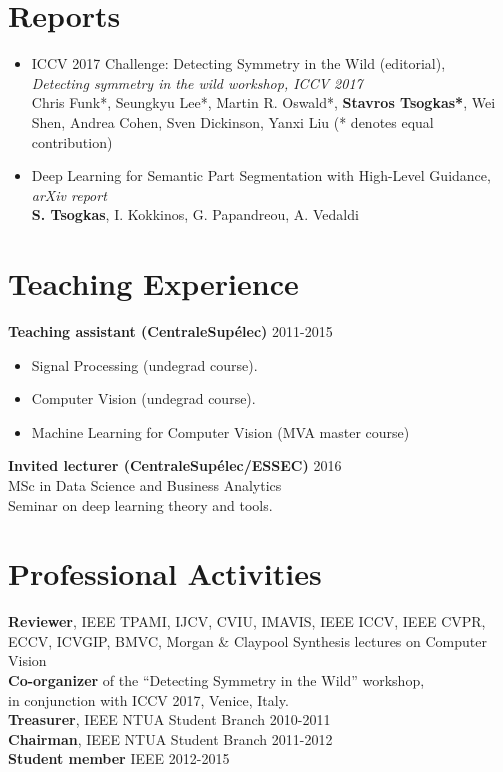 \documentclass[margin]{res}
\begin{document}
\begin{resume}
\section{Reports}
	\begin{itemize}
		\item ICCV 2017 Challenge: Detecting Symmetry in the Wild (editorial), \\
		\emph{Detecting symmetry in the wild workshop, ICCV 2017}\\
		Chris Funk*, Seungkyu Lee*, Martin R. Oswald*, \textbf{Stavros Tsogkas*}, 
		Wei Shen, Andrea Cohen, Sven Dickinson, Yanxi Liu 
		(* denotes equal contribution)
		\item  Deep Learning for Semantic Part Segmentation with High-Level Guidance, \emph{arXiv report}\\
		\textbf{S. Tsogkas}, I. Kokkinos, G. Papandreou, A. Vedaldi 
  \end{itemize}



\section{Teaching Experience} 
	\textbf{Teaching assistant (CentraleSup\'elec)}   \hfill 2011-2015 
	\begin{itemize}
		\item Signal Processing  (undegrad course).  
		\item Computer Vision  (undegrad course).
		\item Machine Learning for Computer Vision (MVA master course)
	\end{itemize}
	\textbf{Invited lecturer (CentraleSup\'elec/ESSEC)} \hfill 2016 \\
	MSc in Data Science and Business Analytics \\
	Seminar on deep learning theory and tools.


\section{Professional Activities} 
	\textbf{Reviewer}, IEEE TPAMI, IJCV, CVIU, IMAVIS, IEEE ICCV, IEEE CVPR, ECCV, 
	ICVGIP, BMVC, Morgan \& Claypool Synthesis lectures on Computer Vision \\
	\textbf{Co-organizer} of the ``Detecting Symmetry in the Wild'' workshop, \\
	in conjunction with ICCV 2017, Venice, Italy. \\
	\textbf{Treasurer}, IEEE NTUA Student Branch \hfill 2010-2011 \\
	\textbf{Chairman}, IEEE NTUA Student Branch \hfill 2011-2012 \\
	\textbf{Student member} IEEE \hfill 2012-2015


\end{resume}
\end{document}
